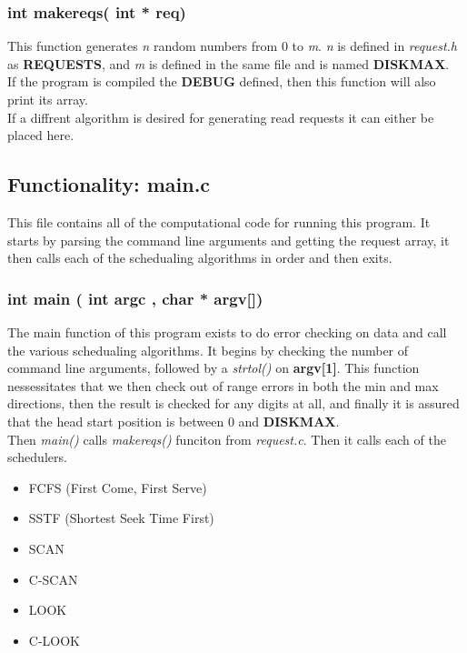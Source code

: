 \documentclass[11pt]{article}
\begin{document}
\subsubsection{ int make\textunderscore reqs( int * req) }

This function generates \textit{n} random numbers from 0 to \textit{m}. \textit{n} is defined in \textit{request.h} as \textbf{REQUESTS}, and \textit{m} is defined in the same file and is named \textbf{DISK\textunderscore MAX}.
\\
If the program is compiled the \textbf{DEBUG} defined, then this function will also print its array.
\\
If a diffrent algorithm is desired for generating read requests it can either be placed here.
\vfill

\subsection{ Functionality: main.c}
This file contains all of the computational code for running this program. It starts by parsing the command line arguments and getting the request array, it then calls each of the schedualing algorithms in order and then exits.

\subsubsection { int main ( int argc , char * argv[])}

The main function of this program exists to do error checking on data and call the various schedualing algorithms. It begins by checking the number of command line arguments, followed by a \textit{strtol()} on \textbf{argv[1]}. This function nessessitates that we then check out of range errors in both the min and max directions, then the result is checked for any digits at all, and finally it is assured that the head start position is between 0 and \textbf{DISK\textunderscore MAX}.
\\
Then \textit{main()} calls \textit{ make\textunderscore reqs()} funciton from \textit{request.c}. Then it calls each of the schedulers.
\begin{itemize}
\item FCFS (First Come, First Serve)
\item SSTF (Shortest Seek Time First)
\item SCAN
\item C-SCAN
\item LOOK
\item C-LOOK
\end{itemize}
\end{document}
